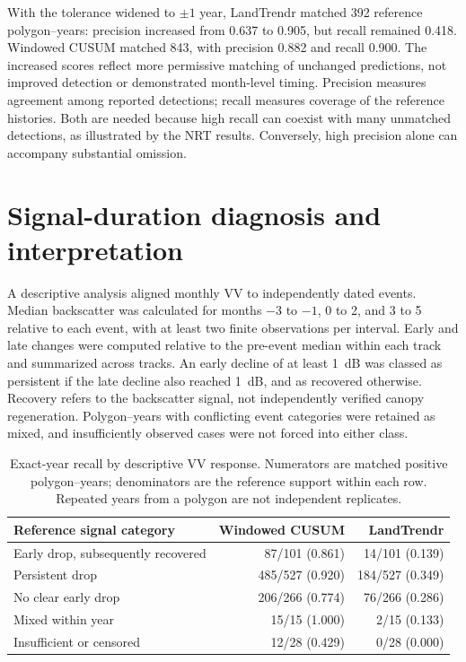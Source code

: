 \documentclass[11pt,a4paper]{article}
\begin{document}
With the tolerance widened to $\pm1$ year, LandTrendr matched 392 reference polygon--years: precision increased from 0.637 to 0.905, but recall remained 0.418. Windowed CUSUM matched 843, with precision 0.882 and recall 0.900. The increased scores reflect more permissive matching of unchanged predictions, not improved detection or demonstrated month-level timing. Precision measures agreement among reported detections; recall measures coverage of the reference histories. Both are needed because high recall can coexist with many unmatched detections, as illustrated by the NRT results. Conversely, high precision alone can accompany substantial omission.

\section{Signal-duration diagnosis and interpretation}
\label{sec:si_signal_diagnosis}
A descriptive analysis aligned monthly VV to independently dated events. Median backscatter was calculated for months $-3$ to $-1$, 0 to 2, and 3 to 5 relative to each event, with at least two finite observations per interval. Early and late changes were computed relative to the pre-event median within each track and summarized across tracks. An early decline of at least 1~dB was classed as persistent if the late decline also reached 1~dB, and as recovered otherwise. Recovery refers to the backscatter signal, not independently verified canopy regeneration. Polygon--years with conflicting event categories were retained as mixed, and insufficiently observed cases were not forced into either class.

\begin{table}[!htbp]
\caption{Exact-year recall by descriptive VV response. Numerators are matched positive polygon--years; denominators are the reference support within each row. Repeated years from a polygon are not independent replicates.}
\label{tab:si_signal_recall}
\centering\small
\setlength{\tabcolsep}{5pt}
\begin{tabular*}{\linewidth}{@{\extracolsep{\fill}}lrr@{}}
\toprule
Reference signal category & Windowed CUSUM & LandTrendr\\
\midrule
Early drop, subsequently recovered & 87/101 (0.861) & 14/101 (0.139)\\
Persistent drop                   & 485/527 (0.920) & 184/527 (0.349)\\
No clear early drop               & 206/266 (0.774) & 76/266 (0.286)\\
Mixed within year                 & 15/15 (1.000) & 2/15 (0.133)\\
Insufficient or censored          & 12/28 (0.429) & 0/28 (0.000)\\
\bottomrule
\end{tabular*}
\end{table}
\end{document}
